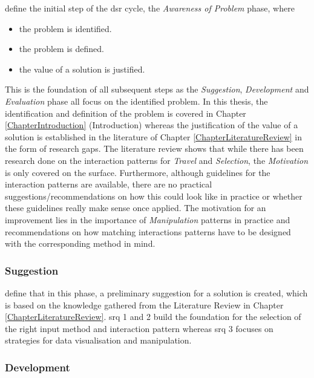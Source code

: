 \cite{Hevner2010} define the initial step of the \gls{dsr} cycle, the \textit{Awareness of Problem} phase, where
\begin{itemize}[noitemsep,nolistsep]
	\item the problem is identified.
	\item the problem is defined.
	\item the value of a solution is justified.
\end{itemize}
This is the foundation of all subsequent steps as the \textit{Suggestion}, \textit{Development} and \textit{Evaluation} phase all focus on the identified problem. In this thesis, the identification and definition of the problem is covered in Chapter \ref{ChapterIntroduction} (Introduction) whereas the justification of the value of a solution is established in the literature of Chapter \ref{ChapterLiteratureReview} in the form of research gaps. The literature review shows that while there has been research done on the interaction patterns for \textit{Travel} and \textit{Selection}, the \textit{Motivation} is only covered on the surface. Furthermore, although guidelines for the interaction patterns are available, there are no practical suggestions/recommendations on how this could look like in practice or whether these guidelines really make sense once applied. The motivation for an improvement lies in the importance of \textit{Manipulation} patterns in practice and recommendations on how matching interactions patterns have to be designed with the corresponding method in mind.



\subsubsection{Suggestion}

\cite{Hevner2010} define that in this phase, a preliminary suggestion for a solution is created, which is based on the knowledge gathered from the Literature Review in Chapter \ref{ChapterLiteratureReview}. \gls{srq} 1 and 2 build the foundation for the selection of the right input method and interaction pattern whereas \gls{srq} 3 focuses on strategies for data visualisation and manipulation.



\subsubsection{Development}

